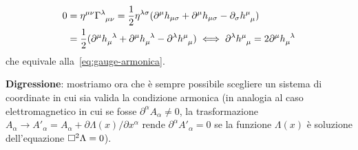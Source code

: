 \begin{equation}
  \begin{split}
    0 &=\eta^{\mu\nu} \tensor{\Gamma}{^{\lambda}_{\mu\nu}} = \frac{1}{2}
    \eta^{\lambda\sigma} (\partial^{\mu}h_{\mu\sigma} + \partial^{\mu}
    h_{\mu\sigma} - \partial_{\sigma}\tensor{h}{^{\mu}_{\mu}}) \\
    &= \frac{1}{2} (\partial^{\mu} \tensor{h}{_{\mu}^{\lambda}} + \partial^{\mu}
    \tensor{h}{_{\mu}^{\lambda}} - \partial^{\lambda} \tensor{h}{^{\mu}_{\mu}})
    \iff \partial^{\lambda} \tensor{h}{^{\mu}_{\mu}} = 2 \partial^{\mu}
    \tensor{h}{_{\mu}^{\lambda}}
  \end{split}
\end{equation}
che equivale alla~\eqref{eq:gauge-armonica}.

\textbf{Digressione}: mostriamo ora che è sempre possibile scegliere un sistema
di coordinate in cui sia valida la condizione armonica (in analogia al caso
elettromagnetico in cui se fosse $\partial^{\alpha}A_{\alpha} \ne 0$, la
trasformazione $A_{\alpha} \to A'_{\alpha} = A_{\alpha} + \partial \Lambda(x)
/ \partial x^{\alpha}$ rende $\partial^{\alpha}A'_{\alpha} = 0$ se la funzione
$\Lambda(x)$ è soluzione dell'equazione $\Box^{2} \Lambda =0$).

